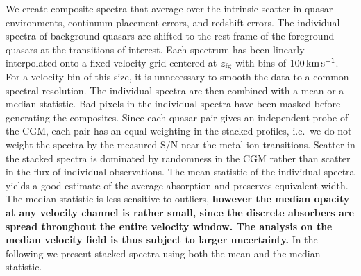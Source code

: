 \documentclass[iop]{emulateapj}
\begin{document}
We create composite spectra that average over the intrinsic scatter in quasar environments, 
continuum placement errors, and redshift errors. The individual spectra of background quasars are 
shifted to the rest-frame of the foreground quasars at the transitions of interest. Each spectrum 
has been linearly interpolated onto a fixed velocity grid centered at $z_{\rm fg}$ with bins of 
$100\,{\rm km\,s^{-1}}$. For a velocity bin of this size, it is unnecessary to smooth the data to 
a common spectral resolution. The individual spectra are then combined with a mean or a median 
statistic. Bad pixels in the individual spectra have been masked before generating the 
composites. Since each quasar pair gives an independent probe of the CGM, each pair has an equal 
weighting in the stacked profiles, i.e.\ we do not weight the spectra by the measured S/N near the 
metal ion transitions. Scatter in the stacked spectra is dominated by randomness in the CGM rather 
than scatter in the flux of individual observations. The mean statistic of the individual spectra 
yields a good estimate of the average absorption and preserves equivalent width. The median 
statistic is less sensitive to outliers, {\bf however the median opacity at any velocity channel is
rather small, since the discrete absorbers are spread throughout the entire velocity window. The 
analysis on the median velocity field is thus subject to larger uncertainty.} In the following we
present stacked spectra using both the mean and the median statistic. 
\end{document}
